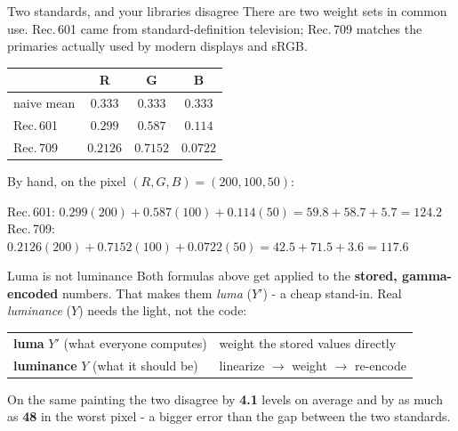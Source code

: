 \documentclass[aspectratio=169]{beamer}
\begin{document}
\begin{frame}{Two standards, and your libraries disagree}
  \small
  There are two weight sets in common use. Rec.\,601 came from standard-definition
  television; Rec.\,709 matches the primaries actually used by modern displays and sRGB.
  \vskip 5pt
  \begin{center}\footnotesize
  \begin{tabular}{lccc}
    \toprule
    & \textbf{R} & \textbf{G} & \textbf{B} \\
    \midrule
    naive mean & $0.333$ & $0.333$ & $0.333$ \\
    Rec.\,601 & $0.299$ & $0.587$ & $0.114$ \\
    Rec.\,709 & $0.2126$ & $0.7152$ & $0.0722$ \\
    \bottomrule
  \end{tabular}
  \end{center}
  \vskip 6pt
  By hand, on the pixel $(R, G, B) = (200, 100, 50)$:
  \vskip 3pt
  \begin{center}\footnotesize
    Rec.\,601: $0.299(200) + 0.587(100) + 0.114(50) = 59.8 + 58.7 + 5.7 = \mathbf{124.2}$\\[2pt]
    Rec.\,709: $0.2126(200) + 0.7152(100) + 0.0722(50) = 42.5 + 71.5 + 3.6 = \mathbf{117.6}$
  \end{center}
  \vskip 6pt
\end{frame}

\begin{frame}{Luma is not luminance}
  \small
  Both formulas above get applied to the \textbf{stored, gamma-encoded} numbers. That
  makes them \emph{luma} ($Y'$) - a cheap stand-in. Real \emph{luminance} ($Y$) needs the
  light, not the code:
  \vskip 6pt
  \begin{center}\footnotesize
  \begin{tabular}{ll}
    \toprule
    \textbf{luma} $Y'$ (what everyone computes) & weight the stored values directly \\
    \textbf{luminance} $Y$ (what it should be) & linearize $\to$ weight $\to$ re-encode \\
    \bottomrule
  \end{tabular}
  \end{center}
  \vskip 8pt
  On the same painting the two disagree by \textbf{4.1} levels on average and by as much
  as \textbf{48} in the worst pixel - a bigger error than the gap between the two
  standards.
  \vskip 8pt
\end{frame}
\end{document}
